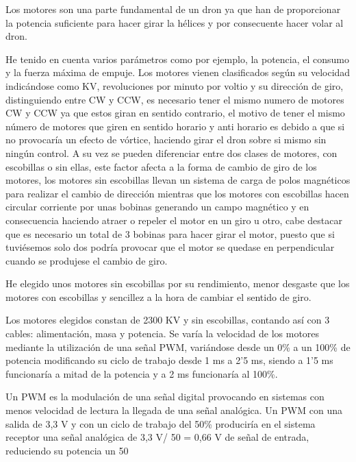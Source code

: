 
Los motores son una parte fundamental de un dron ya que han de proporcionar la potencia suficiente para hacer girar la hélices y por consecuente hacer volar al dron. 
                
 He tenido en cuenta varios parámetros como por ejemplo, la potencia, el consumo y la fuerza máxima de empuje. Los motores vienen clasificados según su velocidad indicándose como KV, revoluciones por minuto por voltio y su dirección de giro, distinguiendo entre CW y CCW, es necesario tener el mismo numero de motores CW y CCW ya que estos giran en sentido contrario, el motivo de tener el mismo número de motores que giren en sentido horario y anti horario es debido a que si no provocaría un efecto de vórtice, haciendo girar el dron sobre si mismo sin ningún control. A su vez se pueden diferenciar entre dos clases de motores, con escobillas o sin ellas, este factor afecta a la forma de cambio de giro de los motores, los motores sin escobillas llevan un sistema de carga de polos magnéticos para realizar el cambio de dirección mientras que los motores con escobillas hacen circular corriente por unas bobinas generando un campo magnético y en consecuencia haciendo atraer o repeler el motor en un giro u otro, cabe destacar que es necesario un total de 3 bobinas para hacer girar el motor, puesto que si tuviésemos solo dos podría provocar que el motor se quedase en perpendicular cuando se produjese el cambio de giro.
                
 He elegido unos motores sin escobillas por su rendimiento, menor desgaste que los motores con escobillas y sencillez a la hora de cambiar el sentido de giro. 
                
 Los motores elegidos constan de 2300 KV y sin escobillas, contando así con 3 cables: alimentación, masa y potencia. Se varía la velocidad de los motores mediante la utilización de una señal PWM, variándose desde un 0\% a un 100\% de potencia modificando su ciclo de trabajo desde 1 ms a 2'5 ms, siendo a 1'5 ms funcionaría a mitad de la potencia y a 2 ms funcionaría al 100\%.
 
 Un PWM es la modulación de una señal digital provocando en sistemas con menos velocidad de lectura la llegada de una señal analógica. Un PWM con una salida de 3,3 V y con un ciclo de trabajo del 50\% produciría en el sistema receptor una señal analógica de 3,3 V/ 50 = 0,66 V de señal de entrada, reduciendo su potencia un 50%